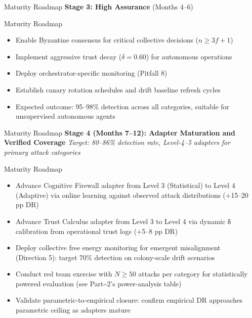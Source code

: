 \documentclass[
  ignorenonframetext,
]{beamer}
\providecommand{\tightlist}{%
  \setlength{\itemsep}{0pt}\setlength{\parskip}{0pt}}
\begin{document}
\begin{frame}[allowframebreaks]{Maturity Roadmap}
\textbf{Stage 3: High Assurance} (Months 4--6)

\end{frame}

\begin{frame}[allowframebreaks]{Maturity Roadmap}
\begin{itemize}
\tightlist
\item
  Enable Byzantine consensus for critical collective decisions
  (\(n \geq 3f + 1\))
\item
  Implement aggressive trust decay (\(\delta = 0.60\)) for autonomous
  operations
\item
  Deploy orchestrator-specific monitoring (Pitfall 8)
\item
  Establish canary rotation schedules and drift baseline refresh cycles
\item
  Expected outcome: 95--98\% detection across all categories, suitable
  for unsupervised autonomous agents
\end{itemize}

\end{frame}

\begin{frame}[allowframebreaks]{Maturity Roadmap}
\textbf{Stage 4 (Months 7--12): Adapter Maturation and Verified
Coverage} \emph{Target: 80--86\% detection rate, Level-4--5 adapters for
primary attack categories}

\end{frame}

\begin{frame}[allowframebreaks]{Maturity Roadmap}
\begin{itemize}
\tightlist
\item
  Advance Cognitive Firewall adapter from Level 3 (Statistical) to Level
  4 (Adaptive) via online learning against observed attack distributions
  (+15--20 pp DR)
\item
  Advance Trust Calculus adapter from Level 3 to Level 4 via dynamic δ
  calibration from operational trust logs (+5--8 pp DR)
\item
  Deploy collective free energy monitoring for emergent misalignment
  (Direction 5): target 70\% detection on colony-scale drift scenarios
\item
  Conduct red team exercise with \(N \geq 50\) attacks per category for
  statistically powered evaluation (see Part\textasciitilde2's
  power-analysis table)
\item
  Validate parametric-to-empirical closure: confirm empirical DR
  approaches parametric ceiling as adapters mature
\end{itemize}

\end{frame}
\end{document}
